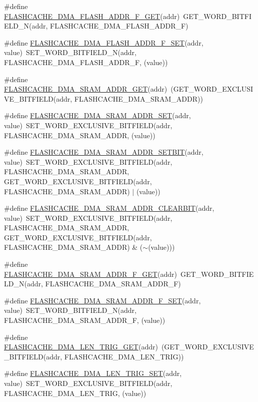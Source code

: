 \begin{DoxyCompactItemize}
\item 
\#define \hyperlink{a00549_a9d6f6714f44131e175a650f428a20901}{FLASHCACHE\_\-DMA\_\-FLASH\_\-ADDR\_\-F\_\-GET}(addr)~GET\_\-WORD\_\-BITFIELD\_\-N(addr, FLASHCACHE\_\-DMA\_\-FLASH\_\-ADDR\_\-F)
\item 
\#define \hyperlink{a00549_ac8bef3bab5bf0da268ac1f9049306916}{FLASHCACHE\_\-DMA\_\-FLASH\_\-ADDR\_\-F\_\-SET}(addr, value)~SET\_\-WORD\_\-BITFIELD\_\-N(addr, FLASHCACHE\_\-DMA\_\-FLASH\_\-ADDR\_\-F, (value))
\item 
\#define \hyperlink{a00549_aa03985b2eaad18239960deabc051c952}{FLASHCACHE\_\-DMA\_\-SRAM\_\-ADDR\_\-GET}(addr)~(GET\_\-WORD\_\-EXCLUSIVE\_\-BITFIELD(addr, FLASHCACHE\_\-DMA\_\-SRAM\_\-ADDR))
\item 
\#define \hyperlink{a00549_a8cf6b9bcb25c4f95caeb22b85c7249ea}{FLASHCACHE\_\-DMA\_\-SRAM\_\-ADDR\_\-SET}(addr, value)~SET\_\-WORD\_\-EXCLUSIVE\_\-BITFIELD(addr, FLASHCACHE\_\-DMA\_\-SRAM\_\-ADDR, (value))
\item 
\#define \hyperlink{a00549_abff97fd93f779e2ae7b328751c9625d6}{FLASHCACHE\_\-DMA\_\-SRAM\_\-ADDR\_\-SETBIT}(addr, value)~SET\_\-WORD\_\-EXCLUSIVE\_\-BITFIELD(addr, FLASHCACHE\_\-DMA\_\-SRAM\_\-ADDR, GET\_\-WORD\_\-EXCLUSIVE\_\-BITFIELD(addr, FLASHCACHE\_\-DMA\_\-SRAM\_\-ADDR) $|$ (value))
\item 
\#define \hyperlink{a00549_abb52c589c73b467bbb4289703894d8a5}{FLASHCACHE\_\-DMA\_\-SRAM\_\-ADDR\_\-CLEARBIT}(addr, value)~SET\_\-WORD\_\-EXCLUSIVE\_\-BITFIELD(addr, FLASHCACHE\_\-DMA\_\-SRAM\_\-ADDR, GET\_\-WORD\_\-EXCLUSIVE\_\-BITFIELD(addr, FLASHCACHE\_\-DMA\_\-SRAM\_\-ADDR) \& ($\sim$(value)))
\item 
\#define \hyperlink{a00549_a4e0128e40ab08c7212170bd5a661e63b}{FLASHCACHE\_\-DMA\_\-SRAM\_\-ADDR\_\-F\_\-GET}(addr)~GET\_\-WORD\_\-BITFIELD\_\-N(addr, FLASHCACHE\_\-DMA\_\-SRAM\_\-ADDR\_\-F)
\item 
\#define \hyperlink{a00549_aa96a14365d14d63a833b58f792984826}{FLASHCACHE\_\-DMA\_\-SRAM\_\-ADDR\_\-F\_\-SET}(addr, value)~SET\_\-WORD\_\-BITFIELD\_\-N(addr, FLASHCACHE\_\-DMA\_\-SRAM\_\-ADDR\_\-F, (value))
\item 
\#define \hyperlink{a00549_ae2e66125a901645f62ba896a20a63e5f}{FLASHCACHE\_\-DMA\_\-LEN\_\-TRIG\_\-GET}(addr)~(GET\_\-WORD\_\-EXCLUSIVE\_\-BITFIELD(addr, FLASHCACHE\_\-DMA\_\-LEN\_\-TRIG))
\item 
\#define \hyperlink{a00549_a89ac12c970a70e4d66f85b01cde31e56}{FLASHCACHE\_\-DMA\_\-LEN\_\-TRIG\_\-SET}(addr, value)~SET\_\-WORD\_\-EXCLUSIVE\_\-BITFIELD(addr, FLASHCACHE\_\-DMA\_\-LEN\_\-TRIG, (value))

\end{DoxyCompactItemize}
